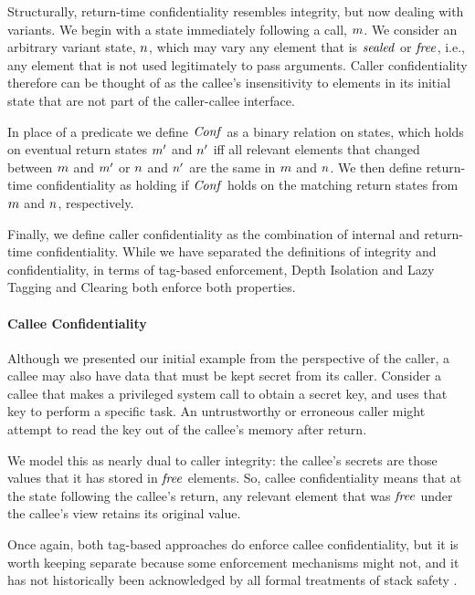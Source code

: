 \documentclass[10pt,conference]{ieeetran}%
\theoremstyle{definition}
\begin{document}
Structurally, return-time confidentiality resembles integrity, but now dealing with
variants. We begin with a state immediately following
a call, \(m\). We consider an arbitrary variant state,
\(n\), which may vary any element that is \(\mathit{sealed}\) or \(\mathit{free}\), 
i.e., any element that is not used legitimately to pass arguments. Caller confidentiality
therefore can be thought of as the callee's insensitivity to elements in its initial state
that are not part of the caller-callee interface.

In place of a predicate we define \(\mathit{Conf}\) as a binary relation on states, 
which holds on eventual return states \(m'\) and \(n'\)
iff all relevant elements that changed between \(m\) and \(m'\) or \(n\) and \(n'\)
are the same in \(m\) and \(n\). We then define
return-time confidentiality as holding if \(\mathit{Conf}\) holds on the matching return states
from \(m\) and \(n\), respectively.

Finally, we define caller confidentiality as the 
combination of internal and return-time confidentiality.
While we have separated the definitions of integrity and confidentiality,
in terms of tag-based enforcement, Depth Isolation and Lazy Tagging and Clearing
both enforce both properties. 

\paragraph*{Callee Confidentiality}

Although we presented our initial example from the perspective of the caller, a callee
may also have data that must be kept secret from its caller. Consider a callee that makes
a privileged system call to obtain a secret key, and uses that key to perform a specific
task. An untrustworthy or erroneous caller might attempt to read the key out of the callee's
memory after return.

We model this as nearly dual to caller integrity: the callee's secrets are those
values that it has stored in \(\mathit{free}\) elements. So, callee confidentiality means that
at the state following the callee's return, any relevant element that was \(\mathit{free}\) under
the callee's view retains its original value.

Once again, both tag-based approaches do enforce callee confidentiality, but it is
worth keeping separate because some enforcement mechanisms might not, and it has not
historically been acknowledged by all formal treatments of stack safety \cite{Georges22:TempsDesCerise}.
\end{document}
